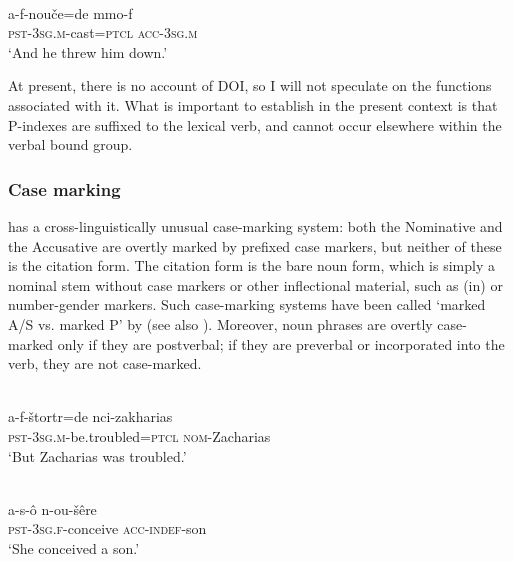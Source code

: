 \documentclass[output=paper]{LSP/langsci}
\begin{document}
\begin{exe}
\ex%
\label{05-gr-ex:13}
\\
\gll a-f-nouče=de mmo-f\\
\textsc{pst-3sg.m}-cast=\textsc{ptcl} \textsc{acc-3sg.m}\\
\glt ‘And he threw him down.’  %
\end{exe}



At present, there is no account of  DOI, so I will not speculate on the functions associated with it. What is important to establish in the present context is that P-indexes are suffixed to the lexical verb, and cannot occur elsewhere within the verbal bound group.

\subsubsection{Case marking}
\label{05-sec:3-2-2}

 has a cross-linguistically unusual case-marking system: both the Nominative  and the Accusative  are overtly marked by prefixed case markers, but neither of these is the citation form. The citation form is the bare noun form, which is simply a nominal stem without case markers or other inflectional material, such as (in) or number-gender markers. Such case-marking systems have been called ‘marked A/S vs. marked P’ by \citealt{Creissels2009Uncommon} (see also \citealt{Grossman2015Verb}). Moreover, noun phrases are overtly case-marked only if they are postverbal; if they are preverbal or incorporated into the verb, they are not case-marked.

\begin{exe}
\ex%
\label{05-gr-ex:14}
\\
\gll a-f-štortr=de nci-zakharias\\
\textsc{pst-3sg.m}-be.troubled=\textsc{ptcl} \textsc{nom}-Zacharias\\
\glt ‘But Zacharias was troubled.’ %
\end{exe}

\begin{exe}
\ex%
\label{05-gr-ex:15}
\\
\gll a-s-ô n-ou-šêre\\
\textsc{pst-3sg.f}-conceive \textsc{acc-indef}-son\\
\glt ‘She conceived a son.’ %
\end{exe}
\end{document}
